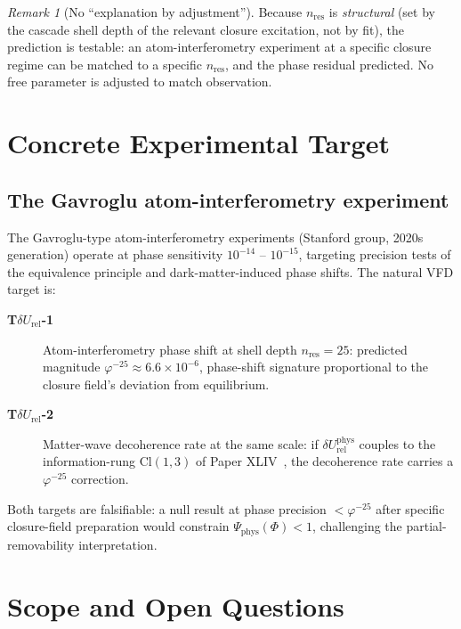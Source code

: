 \documentclass[12pt]{article}
\theoremstyle{definition}
\theoremstyle{remark}
\newtheorem{remark}[theorem]{Remark}
\newcommand{\dUrel}{\delta U_{\mathrm{rel}}}
\begin{document}
\begin{remark}[No ``explanation by adjustment'']
Because $n_{\mathrm{res}}$ is \emph{structural} (set by the cascade shell depth of the relevant closure excitation, not by fit), the prediction is testable: an atom-interferometry experiment at a specific closure regime can be matched to a specific $n_{\mathrm{res}}$, and the phase residual predicted. No free parameter is adjusted to match observation.
\end{remark}

\section{Concrete Experimental Target}\label{sec:experiment}

\subsection{The Gavroglu atom-interferometry experiment}

The Gavroglu-type atom-interferometry experiments (Stanford group, 2020s generation) operate at phase sensitivity $10^{-14}$ -- $10^{-15}$, targeting precision tests of the equivalence principle and dark-matter-induced phase shifts. The natural VFD target is:

\begin{description}
\item[\textbf{T$\dUrel$-1}] Atom-interferometry phase shift at shell depth $n_{\mathrm{res}} = 25$: predicted magnitude $\varphi^{-25} \approx 6.6 \times 10^{-6}$, phase-shift signature proportional to the closure field's deviation from equilibrium.
\item[\textbf{T$\dUrel$-2}] Matter-wave decoherence rate at the same scale: if $\dUrel^{\mathrm{phys}}$ couples to the information-rung $\mathrm{Cl}(1,3)$ of Paper XLIV~\citep{SmartXLIV}, the decoherence rate carries a $\varphi^{-25}$ correction.
\end{description}

Both targets are falsifiable: a null result at phase precision $< \varphi^{-25}$ after specific closure-field preparation would constrain $\Psi_{\mathrm{phys}}(\Phi) < 1$, challenging the partial-removability interpretation.

\section{Scope and Open Questions}\label{sec:scope}
\end{document}
